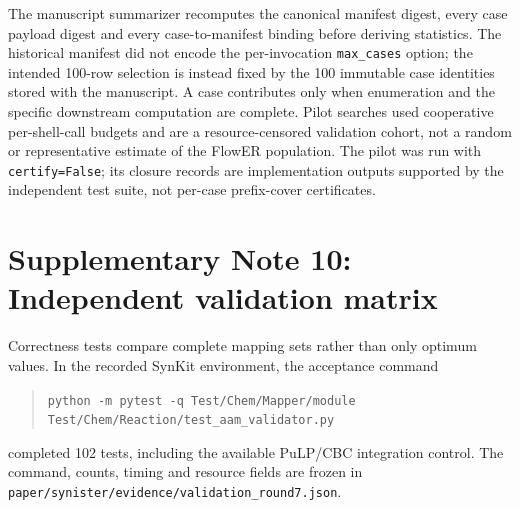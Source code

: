 \documentclass[11pt]{article}
\theoremstyle{definition}
\begin{document}
The manuscript summarizer recomputes the canonical manifest digest, every case
payload digest and every case-to-manifest binding before deriving statistics.
The historical manifest did not encode the per-invocation
\texttt{max\_cases} option; the intended 100-row selection is instead fixed by
the 100 immutable case identities stored with the manuscript.  A case
contributes only when enumeration and the specific downstream computation are
complete.  Pilot searches used cooperative per-shell-call budgets and are a
resource-censored validation cohort, not a random or representative estimate
of the FlowER population.  The pilot was run with \texttt{certify=False}; its
closure records are implementation outputs supported by the independent test
suite, not per-case prefix-cover certificates.

\section{Supplementary Note 10: Independent validation matrix}

Correctness tests compare complete mapping sets rather than only optimum
values.  In the recorded SynKit environment, the acceptance command
\begin{quote}\small
\texttt{python -m pytest -q Test/Chem/Mapper/module\\
Test/Chem/Reaction/test\_aam\_validator.py}
\end{quote}
completed 102 tests, including the available PuLP/CBC integration control.
The command, counts, timing and resource fields are frozen in
\texttt{paper/synister/evidence/validation\_round7.json}.
\end{document}
